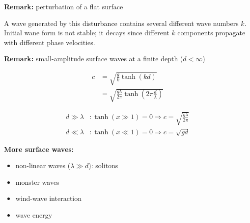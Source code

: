 \begin{framed}
\textbf{Remark:} perturbation of a flat surface

A wave generated by this disturbance contains several different wave numbers $k$. Initial wane form is not stable; it decays since different $k$ components propagate with different phase velocities.
\end{framed}

\begin{framed}
\textbf{Remark:} small-amplitude surface waves at a finite depth ($d<\infty$)

\begin{align}
c &= \sqrt{\frac{g}{k}\tanh(kd)}\\
&= \sqrt{\frac{g\lambda}{2\pi}\tanh\left(2\pi\frac{d}{\lambda}\right)}
\end{align}

\begin{align}
d\gg\lambda&: \tanh(x\gg1)=0  \Rightarrow c=\sqrt{\frac{g\lambda}{2\pi}}\\
d\ll\lambda&: \tanh(x\ll1)=0 \Rightarrow c=\sqrt{gd}
\end{align}
\end{framed}

\textbf{More surface waves:}

\begin{itemize}
\item non-linear waves ($\lambda\gg d$): solitons
\item monster waves
\item wind-wave interaction
\item wave energy
\end{itemize}